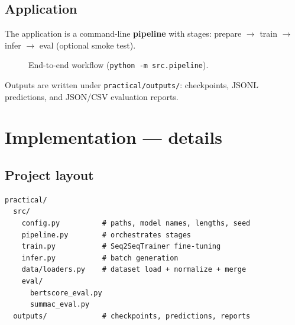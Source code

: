 \documentclass[11pt,a4paper]{article}
\begin{document}
\subsection{Application}

The application is a command-line \textbf{pipeline} with stages: prepare $\rightarrow$ train $\rightarrow$ infer $\rightarrow$ eval (optional smoke test).

\begin{figure}[h]
  \centering
  \caption{End-to-end workflow (\texttt{python -m src.pipeline}).}
\end{figure}

Outputs are written under \texttt{practical/outputs/}: checkpoints, JSONL predictions, and JSON/CSV evaluation reports.

\section{Implementation --- details}

\subsection{Project layout}

\begin{verbatim}
practical/
  src/
    config.py          # paths, model names, lengths, seed
    pipeline.py        # orchestrates stages
    train.py           # Seq2SeqTrainer fine-tuning
    infer.py           # batch generation
    data/loaders.py    # dataset load + normalize + merge
    eval/
      bertscore_eval.py
      summac_eval.py
  outputs/             # checkpoints, predictions, reports
\end{verbatim}
\end{document}
